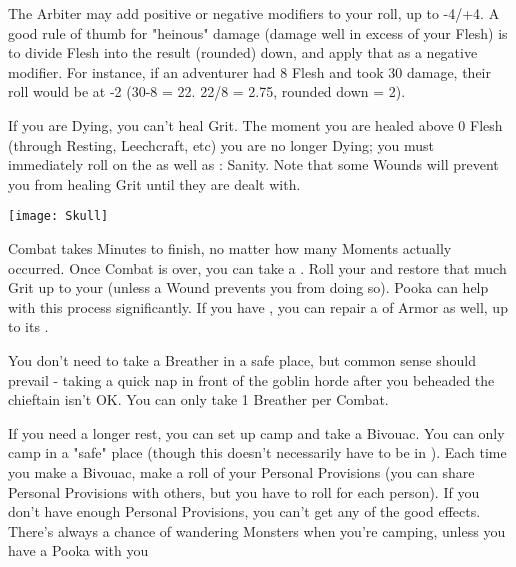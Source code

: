 {  The Arbiter may add positive or negative modifiers to your roll, up to -4/+4.  A good rule of thumb for "heinous" damage (damage well in excess of your Flesh) is to divide \MAX Flesh into the result (rounded) down, and apply that as a negative modifier.  For instance, if an adventurer had 8 Flesh and took 30 damage, their roll would be at -2 (30-8 = 22.  22/8 = 2.75, rounded down = 2).

  If you are Dying, you can't heal Grit.  The moment you are healed above 0 Flesh (through Resting, Leechcraft, etc) you are no longer Dying; you must immediately roll on the  as well as \RS : Sanity.  Note that some Wounds will prevent you from healing Grit until they are dealt with.


    \begin{center}
  \texttt{[image: Skull]}
  \end{center}

  \newpage
 




  Combat takes Minutes to finish, no matter how many Moments actually occurred.  Once Combat is over, you can take a .  Roll your \FLESH and restore that much Grit up to your \MAX (unless a Wound prevents you from doing so). Pooka can help with this process significantly.  If you have , you can repair a \UD of Armor as well, up to its \MAX.

  You don't need to take a Breather in a safe place, but common sense should prevail - taking a quick nap in front of the goblin horde after you beheaded the chieftain isn't OK.  You can only take 1 Breather per Combat.



  If you need a longer rest, you can set up camp and take a Bivouac.  You can only camp in a "safe" place (though this doesn't necessarily have to be in ).  Each time you make a Bivouac, make a \UD roll of your Personal Provisions (you can share Personal Provisions with others, but you have to roll for each person).  If you don't have enough Personal Provisions, you can't get any of the good effects.  There's always a chance of wandering Monsters when you're camping, unless you have a Pooka with you


}
